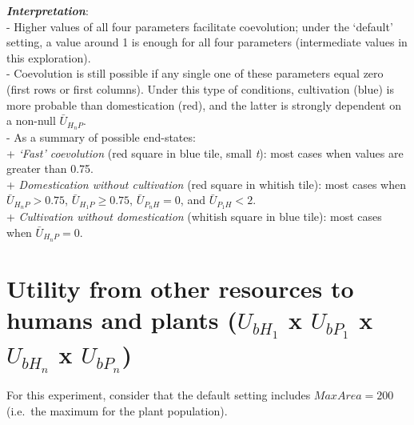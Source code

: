 \documentclass[
]{book}
\begin{document}
\textbf{\emph{Interpretation}}:\\
- Higher values of all four parameters facilitate coevolution; under the `default' setting, a value around 1 is enough for all four parameters (intermediate values in this exploration).\\
- Coevolution is still possible if any single one of these parameters equal zero (first rows or first columns). Under this type of conditions, cultivation (blue) is more probable than domestication (red), and the latter is strongly dependent on a non-null \(\bar{U}_{H_{n}P}\).\\
- As a summary of possible end-states:\\
+ \emph{`Fast' coevolution} (red square in blue tile, small \emph{t}): most cases when values are greater than 0.75.\\
+ \emph{Domestication without cultivation} (red square in whitish tile): most cases when \(\bar{U}_{H_{n}P}>0.75\), \(\bar{U}_{H_{1}P}\geq 0.75\), \(\bar{U}_{P_{n}H}=0\), and \(\bar{U}_{P_{1}H}<2\).\\
+ \emph{Cultivation without domestication} (whitish square in blue tile): most cases when \(\bar{U}_{H_{n}P} = 0\).

\newpage

\hypertarget{utility-from-other-resources-to-humans-and-plants-u_bh_1-x-u_bp_1-x-u_bh_n-x-u_bp_n}{%
\section{\texorpdfstring{Utility from other resources to humans and plants (\(U_{bH_{1}}\) x \(U_{bP_{1}}\) x \(U_{bH_{n}}\) x \(U_{bP_{n}}\))}{Utility from other resources to humans and plants (U\_\{bH\_\{1\}\} x U\_\{bP\_\{1\}\} x U\_\{bH\_\{n\}\} x U\_\{bP\_\{n\}\})}}\label{utility-from-other-resources-to-humans-and-plants-u_bh_1-x-u_bp_1-x-u_bh_n-x-u_bp_n}}


For this experiment, consider that the default setting includes \(MaxArea=200\) (i.e.~the maximum for the plant population).
\end{document}

